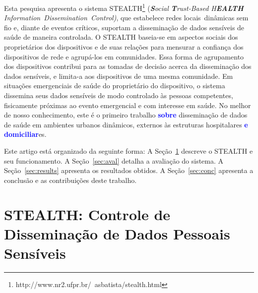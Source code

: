 \documentclass[12pt]{article}
\newcommand{\as}[1]{\textcolor{blue}{{\bf #1}}}
\newcommand{\agn}[1]{\textcolor{auburn}{#1}}
\begin{document}
Esta pesquisa apresenta o sistema \mbox{STEALTH}\footnote{http://www.nr2.ufpr.br/~asbatista/stealth.html} (\textit{\textbf{S}ocial \textbf{T}rust-Based H\textbf{EALTH} \mbox{Information Dissemination Control)}}, que estabelece redes locais~dinâmicas sem fio e, diante de eventos críticos, suportam a disseminação de dados sensíveis de saúde de maneira controlada. O \mbox{STEALTH} baseia-se em aspectos sociais dos proprietários dos dispositivos e de suas relações para mensurar a confiança dos dispositivos de rede e agrupá-los em comunidades. Essa forma de agrupamento dos dispositivos contribui para as tomadas de decisão acerca da disseminação dos dados sensíveis, e limita-a aos dispositivos de uma mesma comunidade.
\agn{Em}
situações emergenciais de saúde do proprietário do dispositivo, o sistema dissemina seus dados sensíveis de modo controlado às pessoas competentes, fisicamente próximas ao evento emergencial e com interesse em saúde. No melhor de nosso conhecimento, este é o primeiro trabalho \as{sobre}
disseminação de dados de saúde em ambientes urbanos dinâmicos, externos às estruturas hospitalares  \as{e domiciliar}\agn{es}. 

Este artigo está organizado da seguinte forma: A Seção~\ref{sec:sistema} descreve o \mbox{STEALTH} e seu funcionamento. A Seção~\ref{sec:aval} detalha a avaliação do sistema. A Seção~\ref{sec:results} apresenta os resultados obtidos. A Seção~\ref{sec:conc} apresenta a conclusão e as contribuições deste trabalho.

\vspace{-0.2cm}

\section{STEALTH: Controle de Disseminação de Dados Pessoais Sensíveis} \label{sec:sistema}
\end{document}
